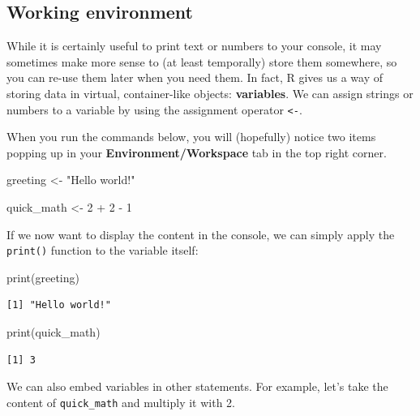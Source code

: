 \documentclass[
  11pt,
  letterpaper,
  DIV=11,
  numbers=noendperiod]{scrreprt}
\newenvironment{Shaded}{\begin{snugshade}}{\end{snugshade}}
\newcommand{\DecValTok}[1]{\textcolor[rgb]{0.68,0.00,0.00}{#1}}
\newcommand{\FunctionTok}[1]{\textcolor[rgb]{0.28,0.35,0.67}{#1}}
\newcommand{\NormalTok}[1]{\textcolor[rgb]{0.00,0.23,0.31}{#1}}
\newcommand{\OtherTok}[1]{\textcolor[rgb]{0.00,0.23,0.31}{#1}}
\newcommand{\SpecialCharTok}[1]{\textcolor[rgb]{0.37,0.37,0.37}{#1}}
\newcommand{\StringTok}[1]{\textcolor[rgb]{0.13,0.47,0.30}{#1}}
\begin{document}
\subsection{Working environment}\label{working-environment}

While it is certainly useful to print text or numbers to your console,
it may sometimes make more sense to (at least temporally) store them
somewhere, so you can re-use them later when you need them. In fact, R
gives us a way of storing data in virtual, container-like objects:
\textbf{variables}. We can assign strings or numbers to a variable by
using the assignment operator \texttt{\textless{}-}.

When you run the commands below, you will (hopefully) notice two items
popping up in your \textbf{Environment/Workspace} tab in the top right
corner.

\begin{Shaded}
\begin{Highlighting}[]
\NormalTok{greeting }\OtherTok{\textless{}{-}} \StringTok{"Hello world!"}

\NormalTok{quick\_math }\OtherTok{\textless{}{-}} \DecValTok{2} \SpecialCharTok{+} \DecValTok{2} \SpecialCharTok{{-}} \DecValTok{1}
\end{Highlighting}
\end{Shaded}

If we now want to display the content in the console, we can simply
apply the \texttt{print()} function to the variable itself:

\begin{Shaded}
\begin{Highlighting}[]
\FunctionTok{print}\NormalTok{(greeting)}
\end{Highlighting}
\end{Shaded}

\begin{verbatim}
[1] "Hello world!"
\end{verbatim}

\begin{Shaded}
\begin{Highlighting}[]
\FunctionTok{print}\NormalTok{(quick\_math)}
\end{Highlighting}
\end{Shaded}

\begin{verbatim}
[1] 3
\end{verbatim}

We can also embed variables in other statements. For example, let's take
the content of \texttt{quick\_math} and multiply it with 2.
\end{document}
